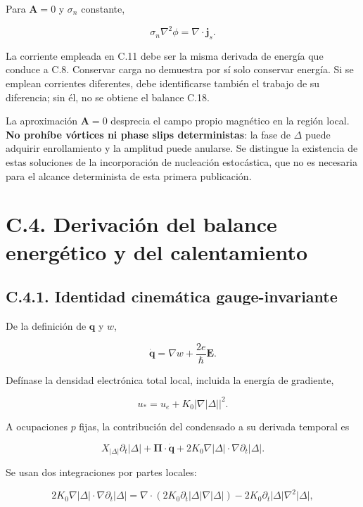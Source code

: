 \documentclass[
  spanish,
  10pt,
  a4paper,
]{article}
\begin{document}
Para \(\mathbf A=0\) y \(\sigma_n\) constante,

\[
\sigma_n\nabla^2\phi=\nabla\cdot\mathbf j_s. \tag{C.11}
\]

La corriente empleada en C.11 debe ser la misma derivada de energía que
conduce a C.8. Conservar carga no demuestra por sí solo conservar
energía. Si se emplean corrientes diferentes, debe identificarse también
el trabajo de su diferencia; sin él, no se obtiene el balance C.18.

La aproximación \(\mathbf A=0\) desprecia el campo propio magnético en
la región local. \textbf{No prohíbe vórtices ni phase slips
deterministas}: la fase de \(\Delta\) puede adquirir enrollamiento y la
amplitud puede anularse. Se distingue la existencia de estas soluciones
de la incorporación de nucleación estocástica, que no es necesaria para
el alcance determinista de esta primera publicación.

\section{C.4. Derivación del balance energético y del
calentamiento}\label{c.4.-derivaciuxf3n-del-balance-energuxe9tico-y-del-calentamiento}

\subsection{C.4.1. Identidad cinemática
gauge-invariante}\label{c.4.1.-identidad-cinemuxe1tica-gauge-invariante}

De la definición de \(\mathbf q\) y \(w\),

\[
\dot{\mathbf q}=\nabla w+\frac{2e}{\hbar}\mathbf E. \tag{C.12}
\]


Defínase la densidad electrónica total local, incluida la energía de
gradiente,

\[
u_* =u_e+K_0|\nabla |\Delta||^2.
\]

A ocupaciones \(p\) fijas, la contribución del condensado a su derivada
temporal es

\[
X_{|\Delta|}\partial_t|\Delta|+\boldsymbol\Pi\cdot\dot{\mathbf q}
+2K_0\nabla |\Delta|\cdot\nabla\partial_t|\Delta|. \tag{C.13}
\]

Se usan dos integraciones por partes locales:

\[
2K_0\nabla |\Delta|\cdot\nabla\partial_t|\Delta|
=\nabla\cdot(2K_0\partial_t|\Delta|\nabla |\Delta|)-2K_0\partial_t|\Delta|\nabla^2|\Delta|,
\]
\end{document}
